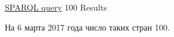 \href{https://query.wikidata.org/#%23List%20of%20%60instances%20of%60%20%22countries%20without%20a%20inception%22%20%0ASELECT%20%3Fcountry%20%3FcountryLabel%20%0AWHERE%0A%7B%0A%20%20%20%20%3Fcountry%20wdt%3AP31%20wd%3AQ6256.%20%23country%0A%20%20%20%20%0A%20%20%20%20MINUS%20%7B%20%3Fcountry%20wdt%3AP571%20%5B%5D%20%7D%20.%20%23inception%20of%20country%0A%20%20%20%20SERVICE%20wikibase%3Alabel%20%7B%20bd%3AserviceParam%20wikibase%3Alanguage%20%22en%22%20%7D%0A%7D%0A%0A}{SPARQL query} 100 Results

На 6 марта 2017 года число таких стран 100.